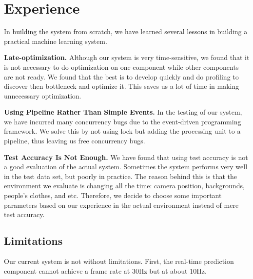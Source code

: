 \section{Experience}

In building the system from scratch, we have learned several lessons in building a practical machine learning system.

\textbf{Late-optimization.} Although our system is very time-sensitive, we found that it is not necessary to do optimization on one component while other components are not ready. We found that the best is to  develop quickly and do profiling to discover then bottleneck and optimize it. This saves us a lot of time in making unnecessary optimization.   

\textbf{Using Pipeline Rather Than Simple Events.} In the testing of our system, we have incurred many concurrency bugs due to the event-driven programming framework. We solve this by not using lock but adding the processing unit to a pipeline, thus leaving us free concurrency bugs.  

\textbf{Test Accuracy Is Not Enough.} We have found that using test accuracy is not a good evaluation of the actual system. Sometimes the system performs very well in the test data set, but poorly in practice. The reason behind this is that the environment we evaluate is changing all the time: camera position, backgrounds, people's clothes, and etc. Therefore, we decide to choose some important parameters based on our experience in the actual environment instead of mere test accuracy. 

\subsection{Limitations}
Our current system is not without limitations. First, the real-time prediction component cannot achieve a frame rate at 30Hz but at about 10Hz.
